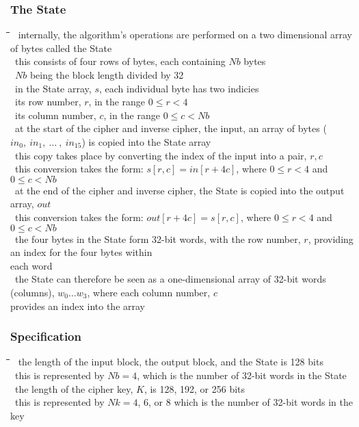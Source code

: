 \documentclass[10pt,letterpaper]{scrartcl}
\newcommand{\tbul}{\textbullet}
\newcommand{\tend}{\>\textendash}
\newcommand{\tasc}{\>\>\textasteriskcentered}
\newcommand{\tabDef}{\hspace{2em}\=\hspace{2em}\=\hspace{2em}\=\hspace{2em}\=\kill}
\begin{document}
	\subsubsection*{The State}\begin{tabbing}\tabDef
	\tbul\ internally, the algorithm's operations are performed on a two dimensional array of bytes called the State \\
	\tbul\ this consists of four rows of bytes, each containing $Nb$ bytes \\
	\tend\ $Nb$ being the block length divided by 32 \\
	\tbul\ in the State array, $s$, each individual byte has two indicies \\
	\tend\ its row number, $r$, in the range $0\leq r < 4$ \\
	\tend\ its column number, $c$, in the range $0\leq c < Nb$\\
	\tbul\ at the start of the cipher and inverse cipher, the input, an array of bytes ($in_0,\ in_1,\ \ldots\ ,\ in_{15}$) is copied into the State array \\
	\tend\ this copy takes place by converting the index of the input into a pair, $r,c$ \\
	\tasc\ this conversion takes the form: $s[r,c]=in[r+4c]$, where $0\leq r < 4$ and $0\leq c < Nb$\\
	\tend\ at the end of the cipher and inverse cipher, the State is copied into the output array, $out$ \\
	\tasc\ this conversion takes the form: $out[r+4c]=s[r,c]$, where $0\leq r < 4$ and $0\leq c < Nb$ \\
	\tbul\ the four bytes in the State form 32-bit words, with the row number, $r$, providing an index for the four bytes within\\ each word \\
	\tbul\ the State can therefore be seen as a one-dimensional array of 32-bit words (columns), $w_0\ldots w_3$, where each column number, $c$\\ provides an index into the array\end{tabbing}
	\subsubsection*{Specification}\begin{tabbing}\tabDef
	\tbul\ the length of the input block, the output block, and the State is 128 bits \\
	\tend\ this is represented by $Nb=4$, which is the number of 32-bit words in the State\\
	\tbul\ the length of the cipher key, $K$, is 128, 192, or 256 bits \\
	\tend\ this is represented by $Nk=4$, $6$, or $8$ which is the number of 32-bit words in the key \\
\end{tabbing}
\end{document}
